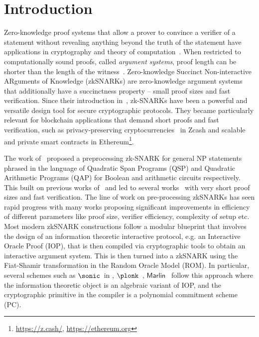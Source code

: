 \section{Introduction}
Zero-knowledge proof systems that allow a prover to convince a verifier of a statement without revealing anything beyond the truth of the statement have applications in cryptography and theory of computation~\cite{FOCS:GolMicWig86,STOC:Fortnow87,C:BGGHKMR88}. 
When restricted to computationally sound proofs, called \emph{argument systems}, proof length can be shorter than the length of the witness~\cite{brassard1988minimum}. 
Zero-knowledge Succinct Non-interactive ARguments of Knowledge (zkSNARKs) are zero-knowledge argument systems that additionally have a succinctness property -- small proof sizes and fast verification. 
Since their introduction in~\cite{micali1994cs}, zk-SNARKs have been a powerful and versatile design tool for secure cryptographic protocols. They became particularly relevant for blockchain applications that demand short proofs and fast verification, such as privacy-preserving cryptocurrencies~\cite{SP:BCGGMT14} in Zcash and scalable and private smart contracts in Ethereum\footnote{\url{https://z.cash/}, \url{https://ethereum.org}}.

The work of~\cite{EC:GGPR13} proposed a preprocessing zk-SNARK for general NP statements phrased in the language of Quadratic Span Programs (QSP) and Quadratic Arithmetic Programs (QAP) for Boolean and arithmetic circuits respectively. This built on previous works of~\cite{IKO07,AC:Groth10a,TCC:Lipmaa12} and led to several works~\cite{TCC:BCIOP13,SP:PHGR13,C:BCGTV13,AC:Lipmaa13,USENIX:BCTV14,EC:Groth16} with very short proof sizes and fast verification. 
The line of work on pre-processing zkSNARKs has seen rapid progress with many works proposing significant improvements in efficiency of different parameters like proof size, verifier efficiency, complexity of setup etc.
Most modern zkSNARK constructions follow a modular blueprint that involves the design of an information theoretic interactive protocol, e.g. an Interactive Oracle Proof (IOP), that is then compiled via cryptographic tools to obtain an interactive argument system.  This is then turned into a zkSNARK using the Fiat-Shamir transformation in the Random Oracle Model (ROM).
In particular, several schemes such as
$\sonic$~in \cite{CCS:MBKM19}, $\plonk$~\cite{EPRINT:GabWilCio19}, $\textsf{Marlin}$~\cite{EC:CHMMVW20} 
follow this approach where the information theoretic object is an algebraic variant of IOP, and the cryptographic primitive in the compiler is a polynomial commitment scheme (PC).  

